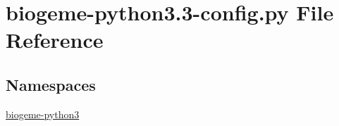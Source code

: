 \hypertarget{biogeme-python3_83-config_8py}{\section{biogeme-\/python3.3-\/config.py File Reference}
\label{biogeme-python3_83-config_8py}
}
\subsection*{Namespaces}
\begin{DoxyCompactItemize}
\item 
 \hyperlink{namespacebiogeme-python3}{biogeme-\/python3}
\end{DoxyCompactItemize}
